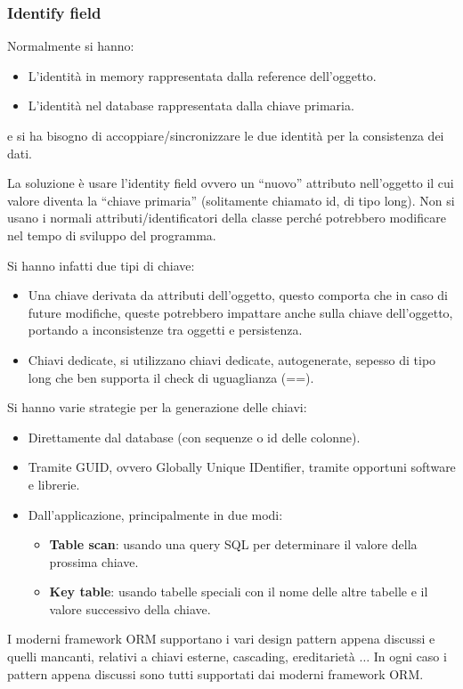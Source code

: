 \subsubsection{Identify field}
Normalmente si hanno:
\begin{itemize}
      \item L'identità in memory rappresentata dalla reference dell'oggetto.
      \item L'identità nel database rappresentata dalla chiave primaria.
\end{itemize}
e si ha bisogno di accoppiare/sincronizzare le due identità per la consistenza
dei dati.

La soluzione è usare l'identity field ovvero un “nuovo” attributo nell'oggetto
il cui valore diventa la “chiave primaria” (solitamente chiamato id, di tipo long).
Non si usano i normali attributi/identificatori della classe perché potrebbero
modificare nel tempo di sviluppo del programma.

Si hanno infatti due tipi di chiave:
\begin{itemize}
      \item Una chiave derivata da attributi dell'oggetto, questo comporta
            che in caso di future modifiche, queste potrebbero impattare anche 
            sulla chiave dell'oggetto, portando a inconsistenze tra oggetti e 
            persistenza.
      \item Chiavi dedicate, si utilizzano chiavi dedicate, autogenerate, sepesso
            di tipo long che ben supporta il check di uguaglianza (==).
\end{itemize}
Si hanno varie strategie per la generazione delle chiavi:
\begin{itemize}
      \item Direttamente dal database (con sequenze o id delle colonne).
      \item Tramite GUID, ovvero Globally Unique IDentifier, tramite opportuni
            software e librerie.
      \item Dall'applicazione, principalmente in due modi:
            \begin{itemize}
                  \item \textbf{Table scan}: usando una query SQL per determinare
                        il valore della prossima chiave.
                  \item \textbf{Key table}: usando tabelle speciali con il nome
                        delle altre tabelle e il valore successivo della chiave.
            \end{itemize}
\end{itemize}
I moderni framework ORM supportano i vari design pattern appena discussi e quelli
mancanti, relativi a chiavi esterne, cascading, ereditarietà $\dots$ In ogni caso
i pattern appena discussi sono tutti supportati dai moderni framework ORM.
